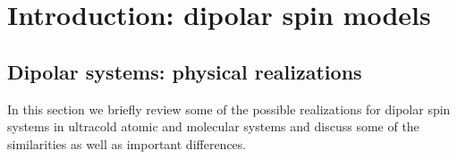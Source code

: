 \chapter{Introduction: dipolar spin models}
\label{dipolar_spinmodels}



\section{Dipolar systems: physical realizations}
In this section we briefly review some of the possible realizations for dipolar spin
systems in ultracold atomic and molecular systems and discuss some of the similarities as well as important differences.


